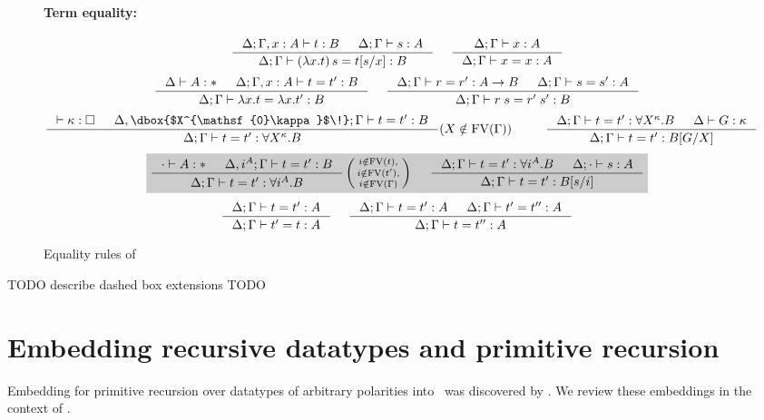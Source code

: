 \begin{figure}
\begin{singlespace}
\paragraph{Term equality:} 
\[
   \inference{\Delta;\Gamma,x:A |- t:B & \Delta;\Gamma |- s:A}{
              \Delta;\Gamma |- (\lambda x.t)\,s=t[s/x] : B}
 ~~~~
   \inference{\Delta;\Gamma |- x:A}{\Delta;\Gamma |- x=x:A}
\]
\[ \inference{\Delta |- A:* & \Delta;\Gamma,x:A |- t=t':B}{
              \Delta;\Gamma |- \lambda x.t = \lambda x.t':B}
 ~~~~
   \inference{\Delta;\Gamma |- r=r':A-> B & \Delta;\Gamma |- s=s':A}{
              \Delta;\Gamma |- r\;s=r'\;s':B}
\]
\[ \inference{ |- \kappa:\square
	     & \Delta, \dbox{$X^{\mathsf{0}\kappa}$\!};\Gamma |- t=t' : B}{
              \Delta;\Gamma |- t=t' : \forall X^\kappa.B}
	     (X\notin\FV(\Gamma))
 ~~~~ ~~~~
   \inference{ \Delta;\Gamma |- t=t' : \forall X^\kappa.B
             & \Delta |- G:\kappa }{
              \Delta;\Gamma |- t=t' : B[G/X]}
\]
\[ \newFi{
   \inference{\cdot |- A:* & \Delta, i^A;\Gamma |- t=t' : B}{
              \Delta;\Gamma |- t=t' : \forall i^A.B}
   \left(\begin{smallmatrix}
		i\notin\FV(t),\\
		i\notin\FV(t'),\\
		i\notin\FV(\Gamma)\end{smallmatrix}\right)
 ~~~~
   \inference{ \Delta;\Gamma |- t=t' : \forall i^A.B
             & \Delta;\cdot |- s:A}{
              \Delta;\Gamma |- t=t' : B[s/i]} }
\]
\[ \inference{\Delta;\Gamma |- t=t':A}{\Delta;\Gamma |- t'=t:A}
 ~~~~
   \inference{\Delta;\Gamma |- t=t':A & \Delta;\Gamma |- t'=t'':A}{
              \Delta;\Gamma |- t=t'':A}
\]
\end{singlespace}
\caption{Equality rules of \Fixi}
\label{fig:eqFixi}
\end{figure}

TODO describe dashed box extensions TODO


\section{Embedding recursive datatypes and primitive recursion}
\label{sec:fixi:data}
Embedding for primitive recursion over datatypes of arbitrary polarities into
\Fixi\ was discovered by \citet{AbeMat04}. We review these embeddings
in the context of \Fixi.

